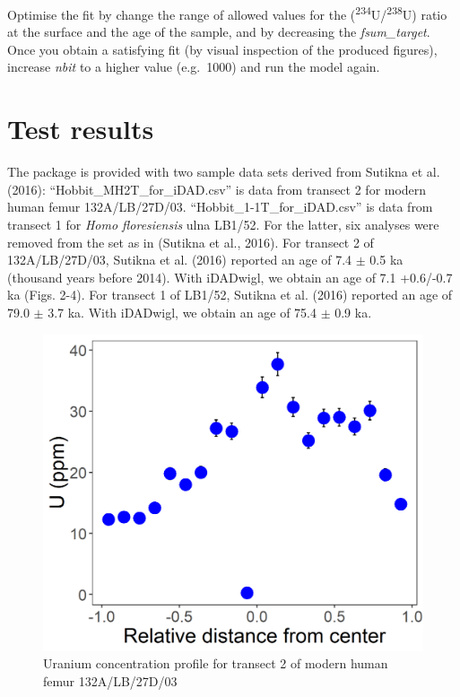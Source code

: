 \documentclass[]{article}
\begin{document}
Optimise the fit by change the range of allowed values for the
(\textsuperscript{234}U/\textsuperscript{238}U) ratio at the surface and
the age of the sample, and by decreasing the \emph{fsum\_target}. Once
you obtain a satisfying fit (by visual inspection of the produced
figures), increase \emph{nbit} to a higher value (e.g.~1000) and run the
model again.

\hypertarget{test-results}{%
\section{Test results}\label{test-results}}

The package is provided with two sample data sets derived from Sutikna
et al. (2016): ``Hobbit\_MH2T\_for\_iDAD.csv'' is data from transect 2
for modern human femur 132A/LB/27D/03. ``Hobbit\_1-1T\_for\_iDAD.csv''
is data from transect 1 for \emph{Homo floresiensis} ulna LB1/52. For
the latter, six analyses were removed from the set as in (Sutikna et
al., 2016). For transect 2 of 132A/LB/27D/03, Sutikna et al. (2016)
reported an age of 7.4 \(\pm\) 0.5 ka (thousand years before 2014). With
iDADwigl, we obtain an age of 7.1 +0.6/-0.7 ka (Figs. 2-4). For transect
1 of LB1/52, Sutikna et al. (2016) reported an age of 79.0 \(\pm\) 3.7
ka. With iDADwigl, we obtain an age of 75.4 \(\pm\) 0.9 ka.

\begin{figure}
\centering
\includegraphics{input/U_Hobbit_MH2T_DAD.png}
\caption{Uranium concentration profile for transect 2 of modern human
femur 132A/LB/27D/03}
\end{figure}
\end{document}
